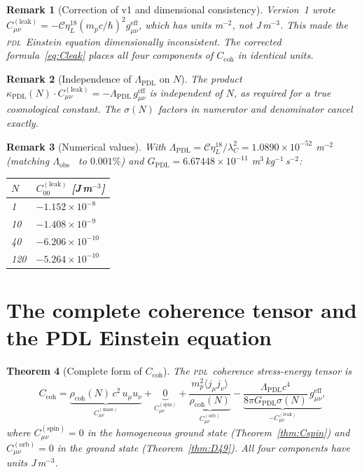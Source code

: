 \documentclass[12pt,a4paper]{article}
\newtheorem{theorem}{Theorem}[section]
\newtheorem{remark}[theorem]{Remark}
\newcommand{\hb}{\hbar}
\newcommand{\PDL}{\textsc{pdl}}
\newcommand{\Ccoh}{C_{\mathrm{coh}}}
\newcommand{\Cmass}{C^{(\mathrm{mass})}}
\newcommand{\Cspin}{C^{(\mathrm{spin})}}
\newcommand{\Corb}{C^{(\mathrm{orb})}}
\newcommand{\Cleak}{C^{(\mathrm{leak})}}
\newcommand{\rhocoh}{\rho_{\mathrm{coh}}}
\newcommand{\sig}{\sigma}
\newcommand{\kPDL}{\kappa_{\mathrm{PDL}}}
\newcommand{\GPDL}{G_{\mathrm{PDL}}}
\newcommand{\geff}{g_{\mu\nu}^{\mathrm{eff}}}
\newcommand{\lambdaC}{\lambda_C}
\newcommand{\etaL}{\eta_L}
\newcommand{\LambdaPDL}{\Lambda_{\mathrm{PDL}}}
\begin{document}
\begin{remark}[Correction of v1 and dimensional consistency]
Version~1 wrote $\Cleak_{\mu\nu} = -\mathcal{C}\etaL^{18}(m_p c/\hb)^2\geff$, which has units m$^{-2}$, not J\,m$^{-3}$. This made the \PDL\ Einstein equation dimensionally inconsistent. The corrected formula~\eqref{eq:Cleak} places all four components of $\Ccoh$ in identical units.
\end{remark}

\begin{remark}[Independence of $\LambdaPDL$ on $N$]
The product $\kPDL(N)\cdot\Cleak_{\mu\nu} = -\LambdaPDL\,\geff$ is independent of $N$, as required for a true cosmological constant. The $\sig(N)$ factors in numerator and denominator cancel exactly.
\end{remark}

\begin{remark}[Numerical values]
With $\LambdaPDL = \mathcal{C}\etaL^{18}/\lambdaC^2 = 1.0890\times10^{-52}$ m$^{-2}$ (matching $\Lambda_{\mathrm{obs}}$~\cite{Planck_2020} to $0.001\%$) and $\GPDL = 6.67448\times10^{-11}$ m$^3$\,kg$^{-1}$\,s$^{-2}$:
\begin{center}
\begin{tabular}{p{1.0cm}p{5.5cm}}
\toprule
$N$ & $\Cleak_{00}$ [J\,m$^{-3}$] \\
\midrule
1 & $-1.152\times10^{-8}$ \\
10 & $-1.408\times10^{-9}$ \\
40 & $-6.206\times10^{-10}$ \\
120 & $-5.264\times10^{-10}$ \\
\bottomrule
\end{tabular}
\end{center}
\end{remark}

\section{The complete coherence tensor and the PDL Einstein equation}
\label{sec:full}

\begin{theorem}[Complete form of $\Ccoh$]
\label{thm:Ccoh_full}
The \PDL\ coherence stress-energy tensor is
\begin{equation}
\Ccoh = \underbrace{\rhocoh(N)\,c^2\,u_\mu u_\nu}_{\Cmass_{\mu\nu}} + \underbrace{0}_{\Cspin_{\mu\nu}} + \underbrace{\dfrac{m_p^2\langle j_\mu j_\nu\rangle}{\rhocoh(N)}}_{\Corb_{\mu\nu}} - \underbrace{\dfrac{\LambdaPDL c^4}{8\pi\GPDL\sig(N)}\,\geff}_{{-\Cleak_{\mu\nu}}},
\label{eq:Ccoh_full}
\end{equation}
where $\Cspin_{\mu\nu} = 0$ in the homogeneous ground state (Theorem~\ref{thm:Cspin}) and $\Corb_{\mu\nu} = 0$ in the ground state (Theorem~\ref{thm:D49}). All four components have units J\,m$^{-3}$.
\end{theorem}
\end{document}
